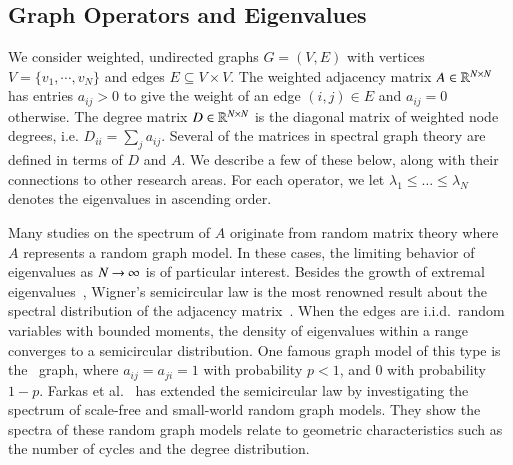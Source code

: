 \subsection{Graph Operators and Eigenvalues}

We consider weighted, undirected graphs $G = (V, E)$ with vertices $V=
\{v_1,\cdots, v_N\}$ and edges $E \subseteq V \times V$. The weighted adjacency
matrix $A\in\mathbb{R}^{N\times N}$ has entries $a_{ij} > 0$ to give the weight of an
edge $(i,j) \in E$ and $a_{ij} = 0$ otherwise. The degree matrix $D\in\mathbb{R}^
{N\times N}$ is the diagonal matrix of weighted node degrees, i.e. $D_{ii} =
\sum_j a_{ij}$. Several of the matrices in spectral graph theory are defined in
terms of $D$ and $A$.  We describe a few of these below, along with their
connections to other research areas. For each operator, we let $\lambda_1 \leq
\ldots \leq \lambda_N$ denotes the eigenvalues in ascending order.

Many studies on the spectrum of $A$ originate from random matrix theory where
$A$ represents a random graph model. In these cases, the limiting behavior of
eigenvalues as $N\mathbin{\to}\infty$ is of particular interest. Besides the growth of
extremal eigenvalues~\cite{chung1997spectral}, Wigner's semicircular law is 
the most renowned result about the spectral distribution of the adjacency
matrix~\cite{wigner1958distribution}. When the edges are i.i.d.~random variables
with bounded moments, the density of eigenvalues within a range converges to a
semicircular distribution. One famous graph model of this type is the
\ErdosRenyi\ graph, where $a_{ij} = a_{ji} = 1$ with probability $p < 1$, and
$0$ with probability $1-p$. Farkas et al.~\cite{farkas2001spectra} has extended
the semicircular law by investigating the spectrum of scale-free and small-world
random graph models. They show the spectra of these random graph models relate
to geometric characteristics such as the number of cycles and the degree
distribution.

